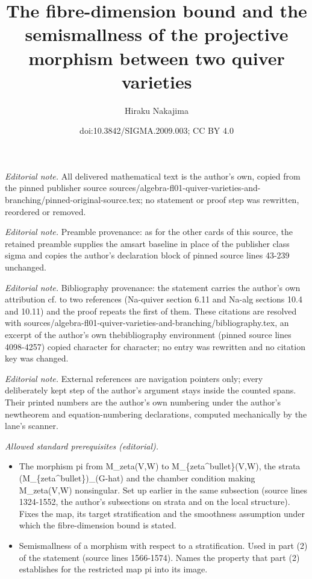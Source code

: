 \documentclass[10pt,a4paper]{amsart}
\title{The fibre-dimension bound and the semismallness of the projective morphism between two quiver varieties}
\author{Hiraku Nakajima}
\date{doi:10.3842/SIGMA.2009.003; CC BY 4.0}
\theoremstyle{definition}
\numberwithin{equation}{section}
\begin{document}
\maketitle
\noindent\textit{Editorial note.} All delivered mathematical text is the author's own, copied from the pinned publisher source sources/algebra-fl01-quiver-varieties-and-branching/pinned-original-source.tex; no statement or proof step was rewritten, reordered or removed.\par\medskip
\noindent\textit{Editorial note.} Preamble provenance: as for the other cards of this source, the retained preamble supplies the amsart baseline in place of the publisher class sigma and copies the author's declaration block of pinned source lines 43-239 unchanged.\par\medskip
\noindent\textit{Editorial note.} Bibliography provenance: the statement carries the author's own attribution cf. to two references (Na-quiver section 6.11 and Na-alg sections 10.4 and 10.11) and the proof repeats the first of them. These citations are resolved with sources/algebra-fl01-quiver-varieties-and-branching/bibliography.tex, an excerpt of the author's own thebibliography environment (pinned source lines 4098-4257) copied character for character; no entry was rewritten and no citation key was changed.\par\medskip
\noindent\textit{Editorial note.} External references are navigation pointers only; every deliberately kept step of the author's argument stays inside the counted spans. Their printed numbers are the author's own numbering under the author's newtheorem and equation-numbering declarations, computed mechanically by the lane's scanner.\par\medskip
\noindent\textit{Allowed standard prerequisites (editorial).}\begin{itemize}
\item The morphism pi from M\_zeta(V,W) to M\_\{zeta\textasciicircum{}bullet\}(V,W), the strata (M\_\{zeta\textasciicircum{}bullet\})\_(G-hat) and the chamber condition making M\_zeta(V,W) nonsingular. Set up earlier in the same subsection (source lines 1324-1552, the author's subsections on strata and on the local structure). Fixes the map, its target stratification and the smoothness assumption under which the fibre-dimension bound is stated.
\item Semismallness of a morphism with respect to a stratification. Used in part (2) of the statement (source lines 1566-1574). Names the property that part (2) establishes for the restricted map pi into its image.
\end{itemize}\medskip
\end{document}
